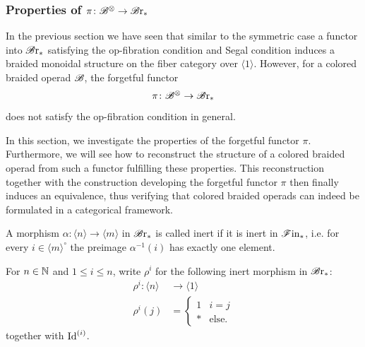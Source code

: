 \subsubsection{Properties of $\pi \colon \mathscr{B}^{\otimes} \to \mathscr{B} \text{r}_{\ast}$}

In the previous section we have seen that similar to the symmetric case a 
functor into $\mathscr{B} \text{r}_{\ast}$ satisfying the op-fibration condition and Segal condition
induces a braided monoidal structure on the fiber category over $\langle 1
\rangle$. However, for a colored braided operad $\mathscr{B}$, the forgetful functor
\[
    \pi \colon \mathscr{B}^{\otimes} \to \mathscr{B} \text{r}_{\ast}
\]
does not satisfy the op-fibration condition in general. 

In this section,
we investigate the properties of the forgetful functor $\pi$. Furthermore, we
will see how to reconstruct the structure of a colored braided operad from such a
functor fulfilling these properties. This reconstruction together with the construction developing the forgetful functor $\pi$
then finally induces an equivalence, thus verifying that colored braided operads can indeed be formulated
in a categorical framework.

\begin{defin}
    A morphism $\alpha \colon \langle n \rangle \to  \langle m \rangle$ in
    $\mathscr{B} \text{r}_{\ast}$ is called inert if it is inert in $\mathscr{F} \text{in}_{\ast}$, i.e. for every $i \in
    \langle m \rangle^{\circ}$ the preimage $\alpha^{-1}(i)$ has exactly one
    element.
\end{defin}

\begin{eg}\label{eg:rho_i} For $n \in \mathbb{N}$ and $1 \leq i \leq n$, write $\rho^i$
    for the following inert morphism in $\mathscr{B} \text{r}_{\ast}$:
    \begin{align*}
        \rho^i \colon \langle n \rangle &\to  \langle 1 \rangle \\
        \rho^i (j) &= 
        \begin{cases}
            1 & i=j \\
            * & \text{else}.
        \end{cases}
    \end{align*}
    together with $\operatorname{Id}^{(i)}$. 
\end{eg}



